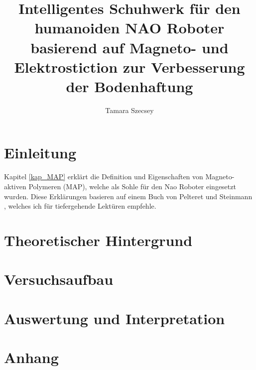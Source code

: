 \documentclass[a4paper,
DIV=13,
12pt,
BCOR=10mm,
department=FakEI,
oneside,
parskip=half,
automark,
]{OTHRartcl}
\title{Intelligentes Schuhwerk für den humanoiden NAO Roboter basierend auf Magneto- und Elektrostiction zur Verbesserung der Bodenhaftung}
\author{Tamara Szecsey}
\begin{document}
\maketitle
\makedeclaration

\thispagestyle{empty}
\tableofcontents	
\clearpage	
\setcounter{page}{1}

\section{Einleitung}
%
Kapitel \ref{kap_MAP} erklärt die Definition und Eigenschaften von Magneto-aktiven Polymeren (MAP), welche als Sohle für den Nao Roboter eingesetzt wurden. Diese Erklärungen basieren auf einem Buch von Pelteret und Steinmann \cite{map2020}, welches ich für tiefergehende Lektüren empfehle. 
\newpage
\section{Theoretischer Hintergrund}

%
\newpage
\section{Versuchsaufbau}

%
%
%
\newpage
\section{Auswertung und Interpretation}
%
%
%
%
\newpage
\section{Anhang}


\FloatBarrier
\newpage
\clearpage	
\thispagestyle{empty}
\printbibliography
\end{document}
